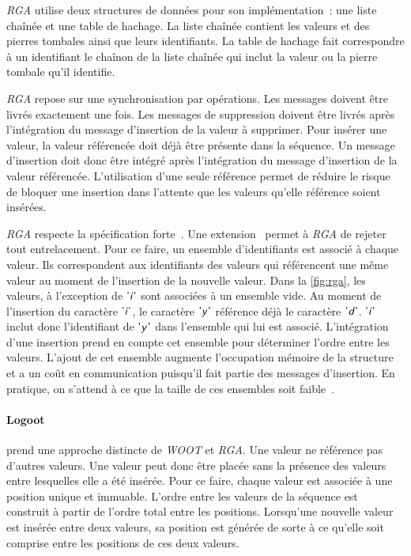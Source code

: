 \emph{RGA} utilise deux structures de données pour son implémentation~: une liste chaînée et une table de hachage.
La liste chaînée contient les valeurs et des pierres tombales ainsi que leurs identifiants.
La table de hachage fait correspondre à un identifiant le chaînon de la liste chaînée qui inclut la valeur ou la pierre tombale qu'il identifie.

\emph{RGA} repose sur une synchronisation par opérations.
Les messages doivent être livrés exactement une fois.
Les messages de suppression doivent être livrés après l'intégration du message d'insertion de la valeur à supprimer.
Pour insérer une valeur, la valeur référencée doit déjà être présente dans la séquence.
Un message d'insertion doit donc être intégré après l'intégration du message d'insertion de la valeur référencée.
L'utilisation d'une seule référence permet de réduire le risque de bloquer une insertion dans l'attente que les valeurs qu'elle référence soient insérées.

\emph{RGA} respecte la spécification forte~\autocite{attiyai_2016_spec-text-editing}.
Une extension~\autocite{kleppmann2019_interleaving} permet à \emph{RGA} de rejeter tout entrelacement.
Pour ce faire, un ensemble d'identifiants est associé à chaque valeur.
Ils correspondent aux identifiants des valeurs qui référencent une même valeur au moment de l'insertion de la nouvelle valeur.
Dans la \autoref{fig:rga}, les valeurs, à l'exception de $\textsf{'\textit{i}'}$ sont associées à un ensemble vide.
Au moment de l'insertion du caractère $\textsf{'\textit{i}'}$, le caractère $\textsf{'\textit{y}'}$ référence déjà le caractère $\textsf{'\textit{d}'}$.
$\textsf{'\textit{i}'}$ inclut donc l'identifiant de $\textsf{'\textit{y}'}$ dans l'ensemble qui lui est associé.
L'intégration d'une insertion prend en compte cet ensemble pour déterminer l'ordre entre les valeurs.
L'ajout de cet ensemble augmente l'occupation mémoire de la structure et a un coût en communication puisqu'il fait partie des messages d'insertion.
En pratique, on s'attend à ce que la taille de ces ensembles soit faible~\autocite{kleppmann2019_interleaving}.




\paragraph{Logoot}\autocite{weiss_2009_logoot} prend une approche distincte de \emph{WOOT} et \emph{RGA}.
Une valeur ne référence pas d'autres valeurs.
Une valeur peut donc être placée sans la présence des valeurs entre lesquelles elle a été insérée.
Pour ce faire, chaque valeur est associée à une position unique et immuable.
L'ordre entre les valeurs de la séquence est construit à partir de l'ordre total entre les positions.
Lorsqu'une nouvelle valeur est insérée entre deux valeurs, sa position est générée de sorte à ce qu'elle soit comprise entre les positions de ces deux valeurs.

